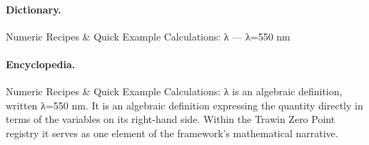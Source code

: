 \paragraph{Dictionary.}
Numeric Recipes \& Quick Example Calculations: λ — λ=550 nm

\paragraph{Encyclopedia.}
Numeric Recipes \& Quick Example Calculations: λ is an algebraic definition, written λ=550 nm. It is an algebraic definition expressing the quantity directly in terms of the variables on its right-hand side. Within the Trawin Zero Point registry it serves as one element of the framework's mathematical narrative.
